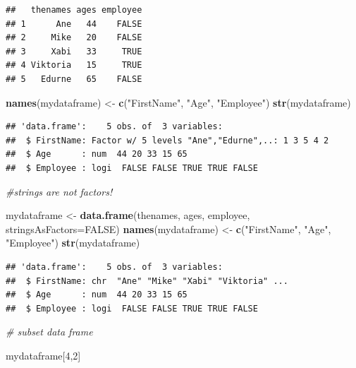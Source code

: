 \documentclass[]{book}
\newenvironment{Shaded}{\begin{snugshade}}{\end{snugshade}}
\newcommand{\KeywordTok}[1]{\textcolor[rgb]{0.13,0.29,0.53}{\textbf{{#1}}}}
\newcommand{\DataTypeTok}[1]{\textcolor[rgb]{0.13,0.29,0.53}{{#1}}}
\newcommand{\DecValTok}[1]{\textcolor[rgb]{0.00,0.00,0.81}{{#1}}}
\newcommand{\StringTok}[1]{\textcolor[rgb]{0.31,0.60,0.02}{{#1}}}
\newcommand{\CommentTok}[1]{\textcolor[rgb]{0.56,0.35,0.01}{\textit{{#1}}}}
\newcommand{\OtherTok}[1]{\textcolor[rgb]{0.56,0.35,0.01}{{#1}}}
\newcommand{\NormalTok}[1]{{#1}}
\begin{document}
\begin{verbatim}
##   thenames ages employee
## 1      Ane   44    FALSE
## 2     Mike   20    FALSE
## 3     Xabi   33     TRUE
## 4 Viktoria   15     TRUE
## 5   Edurne   65    FALSE
\end{verbatim}

\begin{Shaded}
\begin{Highlighting}[]
\KeywordTok{names}\NormalTok{(mydataframe) <-}\StringTok{ }\KeywordTok{c}\NormalTok{(}\StringTok{"FirstName"}\NormalTok{, }\StringTok{"Age"}\NormalTok{, }\StringTok{"Employee"}\NormalTok{)}
\KeywordTok{str}\NormalTok{(mydataframe)}
\end{Highlighting}
\end{Shaded}

\begin{verbatim}
## 'data.frame':    5 obs. of  3 variables:
##  $ FirstName: Factor w/ 5 levels "Ane","Edurne",..: 1 3 5 4 2
##  $ Age      : num  44 20 33 15 65
##  $ Employee : logi  FALSE FALSE TRUE TRUE FALSE
\end{verbatim}

\begin{Shaded}
\begin{Highlighting}[]
\CommentTok{#strings are not factors!}

\NormalTok{mydataframe <-}\StringTok{ }\KeywordTok{data.frame}\NormalTok{(thenames, ages, employee,}
                          \DataTypeTok{stringsAsFactors=}\OtherTok{FALSE}\NormalTok{)}
\KeywordTok{names}\NormalTok{(mydataframe) <-}\StringTok{ }\KeywordTok{c}\NormalTok{(}\StringTok{"FirstName"}\NormalTok{, }\StringTok{"Age"}\NormalTok{, }\StringTok{"Employee"}\NormalTok{)}
\KeywordTok{str}\NormalTok{(mydataframe)}
\end{Highlighting}
\end{Shaded}

\begin{verbatim}
## 'data.frame':    5 obs. of  3 variables:
##  $ FirstName: chr  "Ane" "Mike" "Xabi" "Viktoria" ...
##  $ Age      : num  44 20 33 15 65
##  $ Employee : logi  FALSE FALSE TRUE TRUE FALSE
\end{verbatim}

\begin{Shaded}
\begin{Highlighting}[]
\CommentTok{# subset data frame}

\NormalTok{mydataframe[}\DecValTok{4}\NormalTok{,}\DecValTok{2}\NormalTok{]}
\end{Highlighting}
\end{Shaded}
\end{document}
